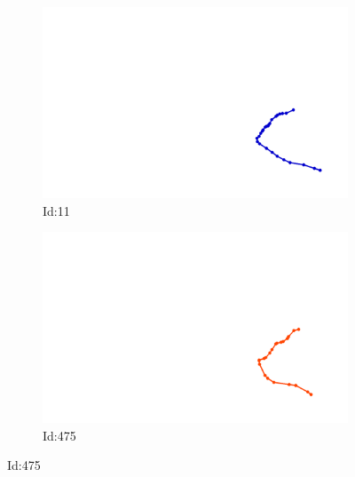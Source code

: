 \documentclass[12pt,twoside]{report}
\begin{document}
\begin{figure}
\centering
\begin{subfigure}[b]{0.20\textwidth}
\centering
\includegraphics[width=\textwidth]{../../trajectories/11.png}
\caption{Id:11}
\end{subfigure}
\begin{subfigure}[b]{0.20\textwidth}
\centering
\includegraphics[width=\textwidth]{../../trajectories/475.png}
\caption{Id:475}
\end{subfigure}
\end{figure}
\end{document}
